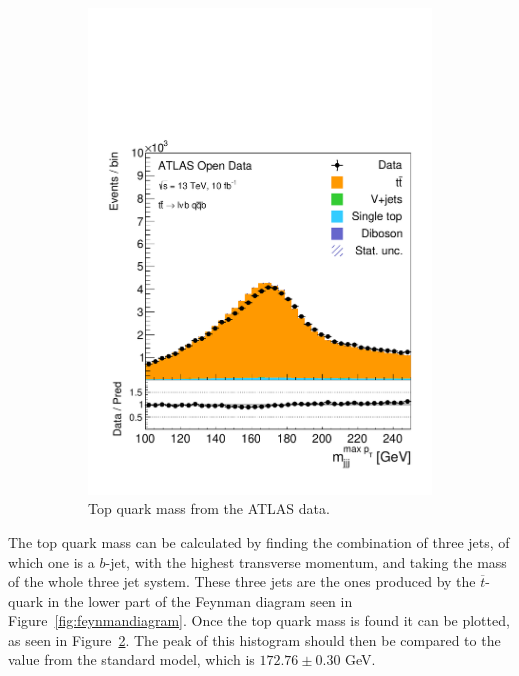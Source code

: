 \documentclass[12pt,a4paper]{article}
\numberwithin{equation}{section}
\begin{document}
\begin{figure}[t!]
\begin{subfigure}[t]{0.47\textwidth}
      \centering
      \includegraphics[width=1.0\textwidth]{figures/hist_Topmass}
      \caption{\label{fig:topmass}Top quark mass from the ATLAS data.}
    \end{subfigure}
    \caption{}
\end{figure}

The top quark mass can be calculated by finding the combination of three jets,
of which one is a $b$-jet, with the highest transverse momentum, and taking the
mass of the whole three jet system. These three jets are the ones produced by
the $\overline{t}$-quark in the lower part of the Feynman diagram seen in
Figure~\ref{fig:feynmandiagram}.
Once the top quark mass is found it can be plotted, as seen in
Figure~\ref{fig:topmass}. The peak of this histogram should then be compared to
the value from the standard model, which is $172.76 \pm 0.30$ GeV\cite{pdg}.
\end{document}

